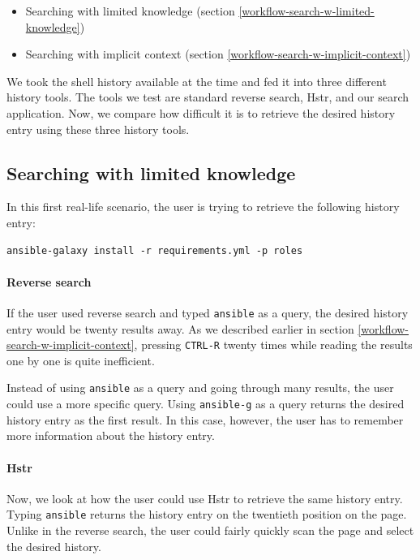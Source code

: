 \begin{itemize}
\item Searching with limited knowledge (section \ref{workflow-search-w-limited-knowledge})
\item Searching with implicit context (section \ref{workflow-search-w-implicit-context})
\end{itemize}
We took the shell history available at the time and fed it into three different history tools. The tools we test are standard reverse search, Hstr, and our search application. Now, we compare how difficult it is to retrieve the desired history entry using these three history tools.

\subsection{Searching with limited knowledge}

In this first real-life scenario, the user is trying to retrieve the following history entry: 

\begin{verbatim}
ansible-galaxy install -r requirements.yml -p roles
\end{verbatim}


\paragraph{Reverse search}
If the user used reverse search and typed \verb|ansible| as a query, the desired history entry would be twenty results away. As we described earlier in section \ref{workflow-search-w-implicit-context}, pressing \verb|CTRL-R| twenty times while reading the results one by one is quite inefficient.

Instead of using \verb|ansible| as a query and going through many results, the user could use a more specific query. Using \verb|ansible-g| as a query returns the desired history entry as the first result. In this case, however, the user has to remember more information about the history entry.

\paragraph{Hstr}
Now, we look at how the user could use Hstr to retrieve the same history entry.
Typing \verb|ansible| returns the history entry on the twentieth position on the page. Unlike in the reverse search, the user could fairly quickly scan the page and select the desired history. 


